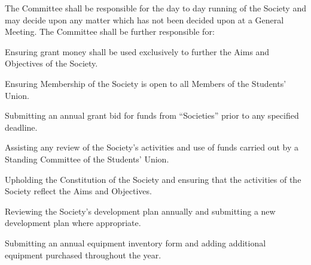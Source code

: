 \begin{clause}
	The Committee shall be responsible for the day to day running of the Society and may decide upon any matter which has not been decided upon at a General Meeting. The Committee shall be further responsible for:
\end{clause}

\begin{subclause}
	 Ensuring grant money shall be used exclusively to further the Aims and Objectives of the Society.
\end{subclause}

\begin{subclause}
	 Ensuring Membership of the Society is open to all Members of the Students' Union.
\end{subclause}

\begin{subclause}
	 Submitting an annual grant bid for funds from ``Societies'' prior to any specified deadline.
\end{subclause}

\begin{subclause}
	 Assisting any review of the Society's activities and use of funds carried out by a Standing Committee of the Students' Union.
\end{subclause}

\begin{subclause}
	 Upholding the Constitution of the Society and ensuring that the activities of the Society reflect the Aims and Objectives.
\end{subclause}

\begin{subclause}
	 Reviewing the Society's development plan annually and submitting a new development plan where appropriate.
\end{subclause}

\begin{subclause}
	 Submitting an annual equipment inventory form and adding additional equipment purchased throughout the year.
\end{subclause}
